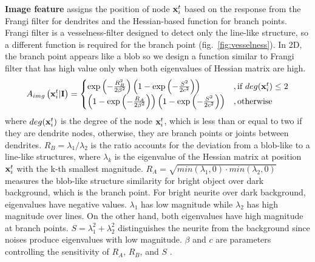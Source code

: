 \documentclass{article}
\begin{document}
{\bf Image feature} assigns the position of node ${\bf x}_i^t$ based on the response from the Frangi filter \cite{Frangi1998} for dendrites and the Hessian-based function for branch points. Frangi filter is a vesselness-filter designed to detect only the line-like structure, so a different function is required for the branch point (fig.~\ref{fig:vesselness}). In 2D, the branch point appears like a blob so we design a function similar to Frangi filter that has high value only when both eigenvalues of Hessian matrix are high.
\begin{equation} \label{eq:vesselness}
A_{img}\left({\bf x}_i^t | {\bf I}\right) =
\begin{cases}
\exp \left( -\frac{R_B^2}{2\beta^2} \right) \left(1-\exp \left( -\frac{S^2}{2c^2} \right) \right) &, \mbox{if } deg({\bf x}_i^t) \le 2 \\
\left( 1-\exp \left( -\frac{R_A}{2\beta^2} \right) \right) \left(1-\exp \left( -\frac{S^2}{2c^2} \right) \right) &, \mbox{otherwise}\\
\end{cases}
\end{equation}
where $deg({\bf x}_i^t)$ is the degree of the node ${\bf x}_i^t$, which is less than or equal to two if they are dendrite nodes, otherwise, they are branch points or joints between dendrites. $R_B = \lambda_1/\lambda_2$ is the ratio accounts for the deviation from a blob-like to a line-like structures, where $\lambda_k$ is the eigenvalue of the Hessian matrix at position ${\bf x}_i^t$ with the k-th smallest magnitude. $R_A = \sqrt{min(\lambda_1,0) \cdot min(\lambda_2,0)}$ measures the blob-like structure similarity for bright object over dark background, which is the branch point. For bright neurite over dark background, eigenvalues have negative values. $\lambda_1$ has low magnitude while $\lambda_2$ has high magnitude over lines. On the other hand, both eigenvalues have high magnitude at branch points. $S = \lambda_1^2 + \lambda_2^2$ distinguishes the neurite from the background since noises produce eigenvalues with low magnitude. $\beta$ and $c$ are parameters controlling the sensitivity of $R_A$, $R_B$, and $S$ \cite{Frangi1998}.
\end{document}
